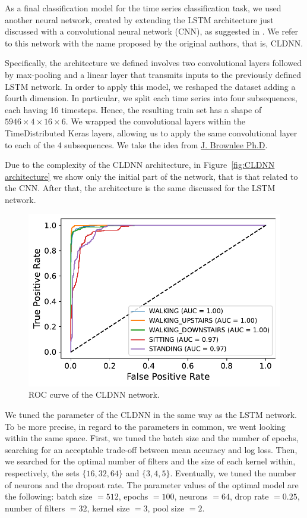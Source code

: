 \documentclass[10pt, a4paper, twocolumn]{article}
\begin{document}
As a final classification model for the time series classification task, we used another neural network, created by extending the LSTM architecture just discussed with a convolutional neural network (CNN), as suggested in \textcite{cldnn:2015}. We refer to this network with the name proposed by the original authors, that is, CLDNN.

Specifically, the architecture we defined involves two convolutional layers followed by max-pooling and a linear layer that transmits inputs to the previously defined LSTM network. In order to apply this model, we reshaped the dataset adding a fourth dimension. In particular, we split each time series into four subsequences, each having 16 timesteps.  Hence, the resulting train set has a shape of $5946 \times 4 \times 16 \times 6$. We wrapped the convolutional layers within the TimeDistributed Keras layers, allowing us to apply the same convolutional layer to each of the 4 subsequences. We take the idea from \href{https://machinelearningmastery.com/how-to-develop-rnn-models-for-human-activity-recognition-time-series-classification/}{J. Brownlee Ph.D}.

Due to the complexity of the CLDNN architecture, in Figure~\ref{fig:CLDNN architecture} we show only the initial part of the network, that is that related to the CNN. After that, the architecture is the same discussed for the LSTM network.

\begin{figure}[b]
    \centering
    \includegraphics[width=0.6\columnwidth]{immagini simone/output_303_0.pdf}
    \caption{ROC curve of the CLDNN network.}
    \label{fig:roc_cldnn}
\end{figure}

We tuned the parameter of the CLDNN in the same way as the LSTM network. To be more precise, in regard to the parameters in common, we went looking within the same space. First, we tuned the batch size and the number of epochs, searching for an acceptable trade-off between mean accuracy and log loss. Then, we searched for the optimal number of filters and the size of each kernel within, respectively, the sets $\{16, 32, 64\}$ and $\{3, 4, 5\}$. Eventually, we tuned the number of neurons and the dropout rate. The parameter values of the optimal model are the following: batch size $= 512$, epochs $= 100$, neurons $= 64$, drop rate $= 0.25$, number of filters $= 32$, kernel size $= 3$, pool size $= 2$.
\end{document}
